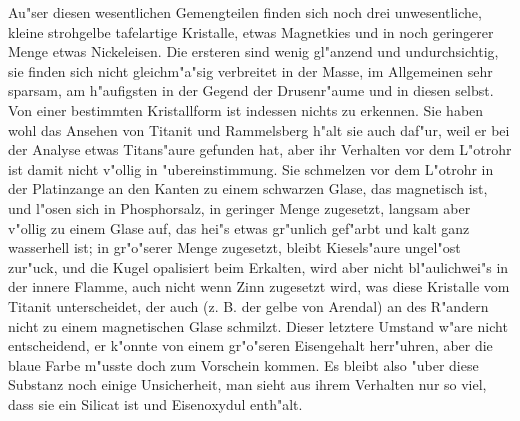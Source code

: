 \documentclass[a4paper, 11pt, oneside, german]{article}
\begin{document}
Au"ser diesen wesentlichen Gemengteilen finden sich noch drei unwesentliche, kleine strohgelbe tafelartige Kristalle, etwas Magnetkies und in noch geringerer Menge etwas Nickeleisen. Die ersteren sind wenig gl"anzend und undurchsichtig, sie finden sich nicht gleichm"a"sig verbreitet in der Masse, im Allgemeinen sehr sparsam, am h"aufigsten in der Gegend der Drusenr"aume und in diesen selbst. Von einer bestimmten Kristallform ist indessen nichts zu erkennen. Sie haben wohl das Ansehen von Titanit und Rammelsberg h"alt sie auch daf"ur, weil er bei der Analyse etwas Titans"aure gefunden hat, aber ihr Verhalten vor dem L"otrohr ist damit nicht v"ollig in "ubereinstimmung. Sie schmelzen vor dem L"otrohr in der Platinzange an den Kanten zu einem schwarzen Glase, das magnetisch ist, und l"osen sich in Phosphorsalz, in geringer Menge zugesetzt, langsam aber v"ollig zu einem Glase auf, das hei"s etwas gr"unlich gef"arbt und kalt ganz wasserhell ist; in gr"o"serer Menge zugesetzt, bleibt Kiesels"aure ungel"ost zur"uck, und die Kugel opalisiert beim Erkalten, wird aber nicht bl"aulichwei"s in der innere Flamme, auch nicht wenn Zinn zugesetzt wird, was diese Kristalle vom Titanit unterscheidet, der auch (z. B. der gelbe von Arendal) an des R"andern nicht zu einem magnetischen Glase schmilzt. Dieser letztere Umstand w"are nicht entscheidend, er k"onnte von einem gr"o"seren Eisengehalt herr"uhren, aber die blaue Farbe m"usste doch zum Vorschein kommen. Es bleibt also "uber diese Substanz noch einige Unsicherheit, man sieht aus ihrem Verhalten nur so viel, dass sie ein Silicat ist und Eisenoxydul enth"alt.
\end{document}
